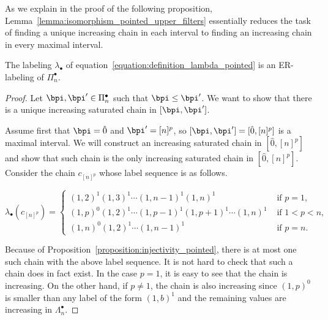 As we explain in the proof of the following proposition, Lemma~\ref{lemma:isomorphism_pointed_upper_filters} essentially reduces the task of finding a unique increasing chain in each interval to finding an increasing chain in every maximal interval.






\begin{prop}\label{proposition:ER_pointed}
 The labeling $\lambda_{\bullet}$ of equation~\eqref{equation:definition_lambda_pointed} is an ER-labeling of $\Pi_{n}^{\bullet}$.
\end{prop}

\begin{proof}
Let $\bpi,\bpi' \in \Pi_n^{\bullet}$ such that $\bpi \leq \bpi'$. We want to show that there is a unique increasing saturated chain in $[\bpi,\bpi']$. 

Assume first that $\bpi=\hat{0}$ and $\bpi'=[n]^p$, so $[\bpi,\bpi']=[\hat{0},[n]^p]$ is a maximal interval. We will construct an increasing saturated chain in $[\hat{0},[n]^p]$ and show that such chain is the only increasing saturated chain in  $[\hat{0},[n]^p]$.  Consider the chain $c_{[n]^p}$ whose label sequence is as follows.

 
\begin{equation}\label{equation:increasing_chain_pointed}
    \lambda_{\bullet}(c_{[n]^p})=
    \begin{cases}
     (1,2)^1 (1,3)^1\cdots (1,n-1)^1 (1,n)^1 & \text{ if } p =1,\\ 
     (1,p)^0(1,2)^1\cdots (1,p-1)^1(1,p+1)^1 \cdots (1,n)^1  & \text{ if } 1<p<n,\\
     (1,n)^0(1,2)^1\cdots (1,n-1)^1& \text{ if } p=n.
    \end{cases}
 \end{equation}   

 
Because of Proposition~\ref{proposition:injectivity_pointed}, there is at most one such chain with the above label sequence.  It is not hard to check that such a chain does in fact exist. In the case $p=1$, it is easy to see that the chain is increasing.  On the other hand, if $p\neq 1$, the chain is also increasing since $(1,p)^0$ is smaller than any  label of the form $(1,b)^1$ and the remaining values are increasing in $\Lambda_n^\bullet$. 


\end{proof}

